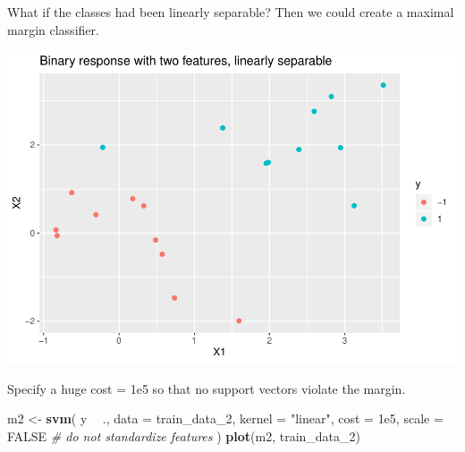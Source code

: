 \documentclass[
]{book}
\newenvironment{Shaded}{\begin{snugshade}}{\end{snugshade}}
\newcommand{\CommentTok}[1]{\textcolor[rgb]{0.56,0.35,0.01}{\textit{#1}}}
\newcommand{\DataTypeTok}[1]{\textcolor[rgb]{0.13,0.29,0.53}{#1}}
\newcommand{\DecValTok}[1]{\textcolor[rgb]{0.00,0.00,0.81}{#1}}
\newcommand{\FloatTok}[1]{\textcolor[rgb]{0.00,0.00,0.81}{#1}}
\newcommand{\KeywordTok}[1]{\textcolor[rgb]{0.13,0.29,0.53}{\textbf{#1}}}
\newcommand{\NormalTok}[1]{#1}
\newcommand{\OperatorTok}[1]{\textcolor[rgb]{0.81,0.36,0.00}{\textbf{#1}}}
\newcommand{\OtherTok}[1]{\textcolor[rgb]{0.56,0.35,0.01}{#1}}
\newcommand{\StringTok}[1]{\textcolor[rgb]{0.31,0.60,0.02}{#1}}
\begin{document}
What if the classes had been linearly separable? Then we could create a maximal margin classifier.

\begin{Shaded}
\end{Shaded}

\includegraphics{data-sci_files/figure-latex/unnamed-chunk-136-1.pdf}

Specify a huge cost = 1e5 so that no support vectors violate the margin.

\begin{Shaded}
\begin{Highlighting}[]
\NormalTok{m2 <-}\StringTok{ }\KeywordTok{svm}\NormalTok{(}
\NormalTok{  y }\OperatorTok{~}\StringTok{ }\NormalTok{., }
  \DataTypeTok{data =}\NormalTok{ train_data_}\DecValTok{2}\NormalTok{,}
  \DataTypeTok{kernel =} \StringTok{"linear"}\NormalTok{,}
  \DataTypeTok{cost =} \FloatTok{1e5}\NormalTok{,}
  \DataTypeTok{scale =} \OtherTok{FALSE}  \CommentTok{# do not standardize features}
\NormalTok{)}
\KeywordTok{plot}\NormalTok{(m2, train_data_}\DecValTok{2}\NormalTok{)}
\end{Highlighting}
\end{Shaded}
\end{document}
